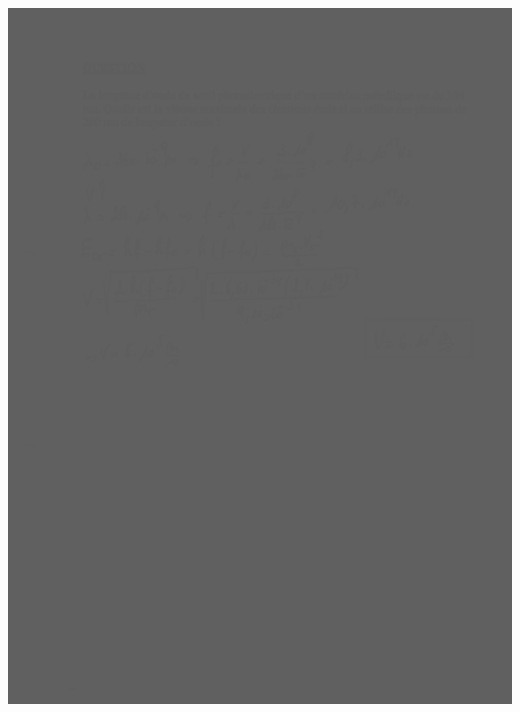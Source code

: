 {\includegraphics[width=17.498cm,height=24.13cm]{Pictures/10000001000002570000033B115B7FCA5E9F77EB.png}

}
